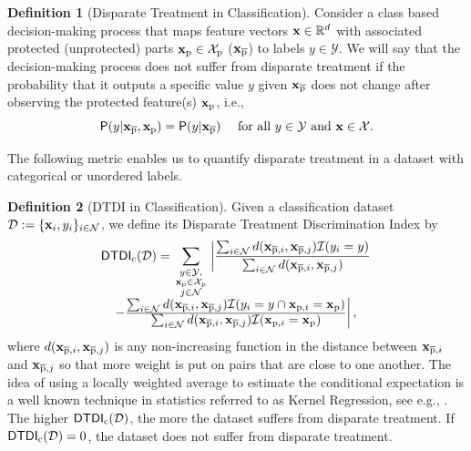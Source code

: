\documentclass[letterpaper]{article} %
\theoremstyle{definition}
\newtheorem{definition}{Definition}[section]
\newcommand{\1}{\ensuremath{{\rm e}}} %
\newcommand{\PR}{\ensuremath{\mathsf{P}}} %
\newcommand{\uprx}{{\bf x}_{\overline{\rm p}}}
\newcommand{\prx}{{\bf x}_{\rm p}}
\newcommand{\uprxi}{{\bf{x}}_{\overline{\rm{p}},i}}
\newcommand{\prxi}{{\bf{x}}_{{\rm{p}},i}}
\newcommand{\uprxj}{{\bf{x}}_{\overline{\rm{p}},j}}
\newcommand{\prX}{{\mathcal X}_{\rm p}}
\begin{document}
\begin{definition}[Disparate Treatment in Classification] Consider a class based decision-making process that maps feature vectors ${\bf x} \in \mathbb R^d$ with associated protected (unprotected) parts $\prx \in \prX$ ($\uprx$) to labels $y \in \mathcal Y$. We will say that the decision-making process does not suffer from disparate treatment if the probability that it outputs a specific value $y$ given $\uprx$ does not change after observing the protected feature(s) $\prx$, i.e.,
$$\PR( y |  \uprx, \prx ) = \PR( y | \uprx ) \quad \text{ for all } y \in \mathcal Y \text { and } {\bf x} \in \mathcal X.$$
\label{def:DT_c}
\end{definition}
%
The following metric enables us to quantify disparate treatment in a dataset with categorical or unordered labels.
\begin{definition}[DTDI in Classification]
Given a classification dataset $\mathcal D:= \{ {\bf x}_i, y_i \}_{i\in \mathcal N}$, we define its Disparate Treatment Discrimination Index by
%
\begin{equation}
\begin{array}{l}
{\mathsf{DTDI}}_{\rm c}({\mathcal D})= 
\displaystyle \sum_{\begin{smallmatrix} y \in \mathcal Y ,\\ \prx \in \prX \\ j \in \mathcal N \end{smallmatrix}} 
\left| 
\frac{ \textstyle \sum_{i \in \mathcal N} d( \uprxi, \uprxj ) \mathcal I (y_i=y)  }
{ \textstyle  \sum_{i \in \mathcal N} d( \uprxi, \uprxj ) }
\right. \\ 
\left.\quad -
\frac{ \textstyle \sum_{i \in \mathcal N} d( \uprxi, \uprxj ) \mathcal I (y_i=y \cap \prxi = \prx )  }
{ \textstyle  \sum_{i \in \mathcal N} d( \uprxi, \uprxj ) \mathcal I (\prxi = \prx ) }  
\right|,
\end{array}
\label{eq:DTDIc}
\end{equation}
where $d(\uprxi, \uprxj)$ is any non-increasing function in the distance between $\uprxi$ and $\uprxj$ so that more weight is put on pairs that are close to one another. The idea of using a locally weighted average to estimate the conditional expectation is a well known technique in statistics referred to as Kernel Regression, see e.g., \cite{nadaraya1964estimating}. The higher ${\mathsf{DTDI}}_{\rm c}({\mathcal D})$, the more the dataset suffers from disparate treatment. If ${\mathsf{DTDI}}_{\rm c}({\mathcal D}) = 0$, the dataset does not suffer from disparate treatment.
\label{def:DTDIc}
\end{definition}
\end{document}
